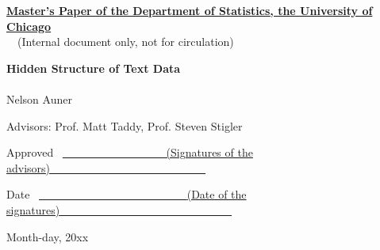 \documentclass[12pt]{article}
\begin{document}
\noindent
\thispagestyle{empty}
\underline{\bf Master's Paper of the Department of Statistics, the
  University of Chicago} 
\\~~(Internal document only, not for circulation) 

\vspace{1.8in}
\begin{center}
{\bf\LARGE Hidden Structure of Text Data }
\\~\\


\vspace{1.4in}
{\Large Nelson Auner}

\vspace{1.3in}
{\Large Advisors: Prof. Matt Taddy, Prof. Steven Stigler \\{\small }}

\end{center}

\vspace{.6in}
{\Large Approved} ~\underline{~~~~~~~~~~~~~~~~~~
\small (Signatures of the advisors)~~~~~~~~~~~~~~~~~~~~~~~~~~~~}

\vspace{.2in}
{\Large Date} ~\underline{~~~~~~~~~~~~~~~~~~~~~~~~~~
{\small (Date of the signatures)}~~~~~~~~~~~~~~~~~~~~~~~~~~~~~~~}

\vfill
\begin{center}{\large Month-day, 20xx}\end{center}

\newpage
\pagestyle{plain}
\setcounter{page}{1}

\begin{abstract}

\vspace{7mm}\noindent 

This paper introduces a variant to existing models of multinomial
regression for text analysis. Using the base model introduced by Taddy
(2013), we extend the data-generating model to incorporate topics not
explained by existing Metadata. In doing so, we seek to both increase
the prediction accuracy over existing techniques, bridge the gap between
multinomial regression and standard topic models, and investigate
methods for discovering new topics in a corpus. We explore computational
aspects of our approach, provide software for parallelization of the
algorithm, and conclude by proposing areas of future research.

\end{abstract}
\end{document}
